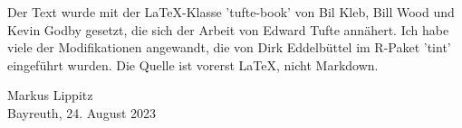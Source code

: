 Der Text wurde mit der LaTeX-Klasse 'tufte-book' von Bil Kleb, Bill Wood und Kevin Godby gesetzt, die sich der Arbeit von Edward Tufte annähert. Ich habe viele der Modifikationen angewandt, die von Dirk Eddelbüttel im R-Paket 'tint' eingeführt wurden. Die Quelle ist vorerst LaTeX, nicht Markdown.




\vspace{2\baselineskip}

Markus Lippitz \\ Bayreuth, 24. August 2023

 
 



